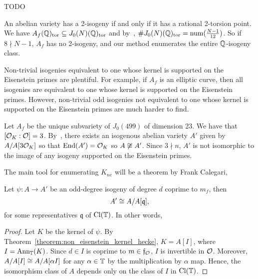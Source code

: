 \documentclass{article}
\begin{document}
\begin{algorithm}{TODO}
\end{algorithm}

\begin{remark}
    An abelian variety has a 2-isogeny if and only if it has a rational
    2-torsion point. We have $A_f(\mathbb{Q})_{\operatorname{tor}} \subseteq J_0(N)(\mathbb{Q})_{\operatorname{tor}}$ and
    by~\cite[Theorem 1]{mazur:eisenstein}, $\# J_0(N)(\mathbb{Q})_{\operatorname{tor}} =
    \mathrm{num}(\frac{N-1}{12})$. So if $8\nmid N-1$, $A_f$ has no 2-isogeny,
    and our method enumerates the entire $\mathbb{Q}$-isogeny class.
\end{remark}

Non-trivial isogenies equivalent to one whose kernel is supported on the
Eisenstein primes are plentiful. For example, if $A_f$ is an elliptic curve,
then all isogenies are equivalent to one whose kernel is supported on the
Eisenstein primes. However, non-trivial odd isogenies not equivalent to one
whose kernel is supported on the Eisenstein primes are much harder to find.

\begin{example}
    Let $A_f$ be the unique subvariety of $J_0(499)$ of dimension 23. We have
    that $[\mathcal{O}_K:\mathcal{O}]=3$. By~\cite[pg. 199]{shimura:intro}, there exists an
    isogenous abelian variety $A'$ given by $A/A[3\mathcal{O}_K]$ so that
    $\operatorname{End}(A')=\mathcal{O}_K$ so $A\not\cong A'$. Since $3\nmid n$, $A'$ is not
    isomorphic to the image of any isogeny supported on the Eisenstein primes.
\end{example}

The main tool for enumerating $K_{ne}$ will be a theorem by Frank Calegari,
\begin{theorem}\label{theorem:non_eisenstein_no_conductor}
    Let $\psi:A\to A'$ be an odd-degree isogeny of degree $d$ coprime to $m_f$,
    then
    \[
        A' \cong A/A[\mathfrak{q}],
    \]
    for some representatives $\mathfrak{q}$ of $\operatorname{Cl}(\mathbb{T})$. In other words, 
\end{theorem}
\begin{proof}
    Let $K$ be the kernel of $\psi$. By
    Theorem~\ref{theorem:non_eisenstein_kernel_hecke}, $K=A[I]$, where
    $I=\operatorname{Ann}_{\mathbb{T}}(K)$. Since $d\in I$ is coprime to $m\in \mathfrak{f}_{\mathcal{O}}$,
    $I$ is invertible in $\mathcal{O}$. Moreover, $A/A[I]\cong A/A[\alpha I]$ for
    any $\alpha\in \mathbb{T}$ by the multiplication by $\alpha$ map. Hence, the
    isomorphism class of $A$ depends only on the class of $I$ in $\operatorname{Cl}(\mathbb{T})$.
\end{proof}
\end{document}
